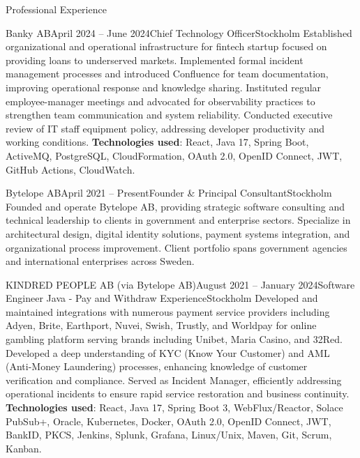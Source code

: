 \documentclass{resume}
\begin{document}
\begin{rSection}{Professional Experience}
\begin{rSubsection}{Banky AB}{April 2024 -- June 2024}{Chief Technology Officer}{Stockholm}
\bItem Established organizational and operational infrastructure for fintech startup focused on providing loans to underserved markets.
\bItem Implemented formal incident management processes and introduced Confluence for team documentation, improving operational response and knowledge sharing.
\bItem Instituted regular employee-manager meetings and advocated for observability practices to strengthen team communication and system reliability.
\bItem Conducted executive review of IT staff equipment policy, addressing developer productivity and working conditions.
\bItem \textbf{Technologies used}: React, Java 17, Spring Boot, ActiveMQ, PostgreSQL, CloudFormation, OAuth 2.0, OpenID Connect, JWT, GitHub Actions, CloudWatch.
\end{rSubsection}

\begin{rSubsection}{Bytelope AB}{April 2021 -- Present}{Founder \& Principal Consultant}{Stockholm}
\bItem Founded and operate Bytelope AB, providing strategic software consulting and technical leadership to clients in government and enterprise sectors.
\bItem Specialize in architectural design, digital identity solutions, payment systems integration, and organizational process improvement.
\bItem Client portfolio spans government agencies and international enterprises across Sweden.
\end{rSubsection}

\begin{rClientSubsection}{KINDRED PEOPLE AB (via Bytelope AB)}{August 2021 -- January 2024}{Software Engineer Java - Pay and Withdraw Experience}{Stockholm}
\bItem Developed and maintained integrations with numerous payment service providers including Adyen, Brite, Earthport, Nuvei, Swish, Trustly, and Worldpay for online gambling platform serving brands including Unibet, Maria Casino, and 32Red.
\bItem Developed a deep understanding of KYC (Know Your Customer) and AML (Anti-Money Laundering) processes, enhancing knowledge of customer verification and compliance.
\bItem Served as Incident Manager, efficiently addressing operational incidents to ensure rapid service restoration and business continuity.
\bItem \textbf{Technologies used}: React, Java 17, Spring Boot 3, WebFlux/Reactor, Solace PubSub+, Oracle, Kubernetes, Docker, OAuth 2.0, OpenID Connect, JWT, BankID, PKCS, Jenkins, Splunk, Grafana, Linux/Unix, Maven, Git, Scrum, Kanban.
\end{rClientSubsection}


\end{rSection}
\end{document}
